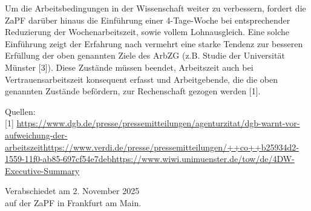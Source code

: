 \documentclass[DIV=calc]{scrartcl}
\begin{document}
Um die Arbeitsbedingungen in der Wissenschaft weiter zu verbessern, fordert die ZaPF darüber hinaus die Einführung einer 4-Tage-Woche bei entsprechender Reduzierung der Wochenarbeitszeit, sowie vollem Lohnausgleich. Eine solche Einführung zeigt der Erfahrung nach vermehrt eine starke Tendenz zur besseren Erfüllung der oben genannten Ziele des ArbZG (z.B. Studie der Universität Münster [3]). Diese Zustände müssen beendet, Arbeitszeit auch bei Vertrauensarbeitszeit konsequent
erfasst und Arbeitgebende, die die oben genannten Zustände befördern, zur Rechenschaft gezogen werden [1].

Quellen:\\

[1] \url{https://www.dgb.de/presse/pressemitteilungen/agenturzitat/dgb-warnt-vor-aufweichung-der-arbeitszeit}\newline
[2] \url{https://www.verdi.de/presse/pressemitteilungen/++co++b25934d2-1559-11f0-ab85-697cf54e7deb}\newline
[3] \url{https://www.wiwi.unimuenster.de/tow/de/4DW-Executive-Summary}


%
\vfill
\begin{flushright}
	Verabschiedet am 2. November 2025 \\
	auf der ZaPF in Frankfurt am Main.
\end{flushright}
\end{document}
